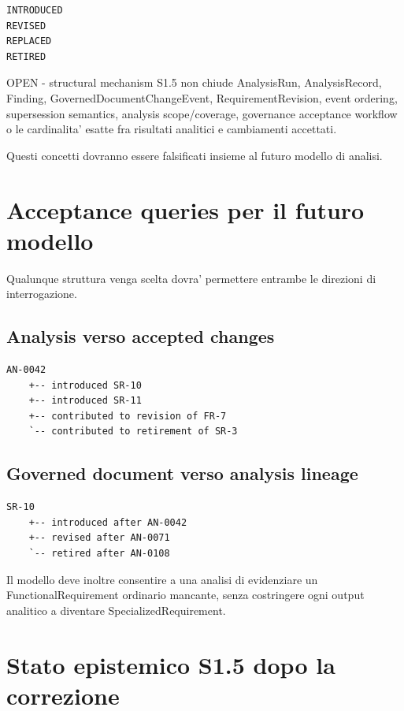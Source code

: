 \documentclass[11pt,a4paper]{article}
\begin{document}
\begin{lstlisting}
INTRODUCED
REVISED
REPLACED
RETIRED
\end{lstlisting}

\begin{openbox}{OPEN - structural mechanism}
S1.5 non chiude AnalysisRun, AnalysisRecord, Finding, GovernedDocumentChangeEvent, RequirementRevision, event ordering, supersession semantics, analysis scope/coverage, governance acceptance workflow o le cardinalita' esatte fra risultati analitici e cambiamenti accettati.
\end{openbox}

Questi concetti dovranno essere falsificati insieme al futuro modello di analisi.

\section{Acceptance queries per il futuro modello}

Qualunque struttura venga scelta dovra' permettere entrambe le direzioni di interrogazione.

\subsection{Analysis verso accepted changes}

\begin{lstlisting}
AN-0042
    +-- introduced SR-10
    +-- introduced SR-11
    +-- contributed to revision of FR-7
    `-- contributed to retirement of SR-3
\end{lstlisting}

\subsection{Governed document verso analysis lineage}

\begin{lstlisting}
SR-10
    +-- introduced after AN-0042
    +-- revised after AN-0071
    `-- retired after AN-0108
\end{lstlisting}

Il modello deve inoltre consentire a una analisi di evidenziare un FunctionalRequirement ordinario mancante, senza costringere ogni output analitico a diventare SpecializedRequirement.

\section{Stato epistemico S1.5 dopo la correzione}
\end{document}
